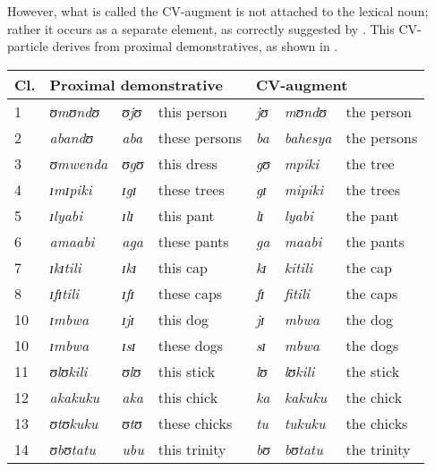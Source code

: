 \documentclass[output=paper]{langscibook}
\begin{document}
However, what is called the CV-aug\-ment is not attached to the lexical noun; rather it occurs as a separate element, as correctly suggested by \citet{Persohn2017}. This CV-particle derives from proximal demonstratives, as shown in .  

\begin{table}
\begin{tabular}{lllllll}
\lsptoprule
Cl. & \multicolumn{3}{l}{Proximal demonstrative} & \multicolumn{3}{l}{CV-aug\-ment}\\
\midrule
{1} & {\itshape ʊmʊndʊ} & {\itshape ʊjʊ} & {this person} & {\textit{jʊ}} & {\itshape mʊndʊ} & {the person}\\
{2} & {\textit{abandʊ}} & {\itshape aba} & {these persons} & {\itshape ba} & {\itshape bahesya} & {the persons}\\
{3} & {\itshape ʊmwenda} & {\itshape ʊgʊ} & {this dress} & {\textit{gʊ}} & {\itshape mpiki} & {the tree}\\
{4} & {\textit{ɪmɪpiki}} & {\textit{ɪgɪ}} & {these trees} & {\textit{gɪ}} & {\itshape mipiki} & {the trees}\\
{5} & {\itshape ɪlyabi} & {\itshape ɪlɪ} & {this pant} & {\textit{lɪ}} & {\itshape lyabi} & {the pant}\\
{6} & {\itshape amaabi} & {\itshape aga} &  these pants & {\itshape ga} & {\itshape maabi} & {the pants}\\
{7} & {\itshape ɪkɪtili} & {\textit{ɪkɪ}} & {this cap} & {\textit{kɪ}} & {\itshape kitili} & {the cap}\\
{8} & {\itshape ɪfɪtili} & {\itshape ɪfɪ} & {these caps} & {\textit{fɪ}} & {\itshape fitili} & {the caps}\\
{10} & {\textit{ɪmbwa}} & {\itshape ɪjɪ} & {this dog} & {\textit{jɪ}} & {\itshape mbwa} & {the dog}\\
{10} & {\textit{ɪmbwa}} & {\textit{ɪsɪ}} & {these dogs} & {\textit{sɪ}} & {\itshape mbwa} & {the dogs}\\
{11} & {\textit{ʊlʊkili}} & {\itshape ʊlʊ} & {this stick} & {\itshape lʊ} & {\textit{lʊkili}} & {the stick}\\
{12} & {\itshape akakuku}  & {\itshape aka} & {this chick} & {\itshape ka} & {\itshape kakuku}  & {the chick}\\
{13} & {\textit{ʊtʊkuku}} & {\textit{ʊtʊ}} & {these chicks} & {\itshape tu} & {\itshape tukuku} & {the chicks}\\
{14} & {\textit{ʊbʊtatu}} & {\itshape ubu} & {this trinity} & {\textit{bʊ}} & { \textit{bʊtatu}} &  the trinity\\

\end{tabular}
\end{table}
\end{document}
